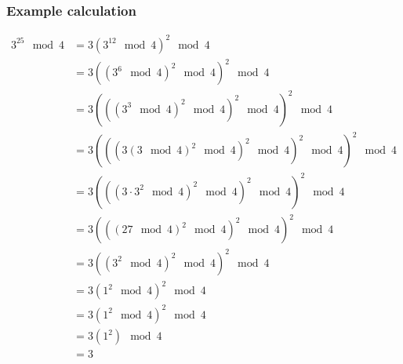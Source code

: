 \documentclass[handout]{beamer}
\begin{document}
\begin{frame}
\frametitle{Example calculation}
\small
\begin{align*}
3^{25}\mod 4 &= 3(3^{12} \mod 4)^2 \mod 4 \\
&= 3((3^6 \mod 4)^2 \mod 4)^2 \mod 4 \\
&= 3(((3^3 \mod 4)^2 \mod 4)^2 \mod 4)^2 \mod 4 \\
&= 3(((3(3 \mod 4)^2\mod 4)^2 \mod 4)^2 \mod 4)^2 \mod 4\\
&=3(((3\cdot3^2\mod 4)^2\mod 4)^2\mod 4)^2 \mod 4 \\
&=3(((27\mod 4)^2\mod 4)^2\mod 4)^2 \mod 4 \\
&=3((3^2\mod 4)^2\mod 4)^2 \mod 4 \\
&=3(1^2\mod 4)^2 \mod 4 \\
&=3(1^2\mod 4)^2 \mod 4 \\
&= 3(1^2) \mod 4\\
&= 3
\end{align*}
\end{frame}
\end{document}
